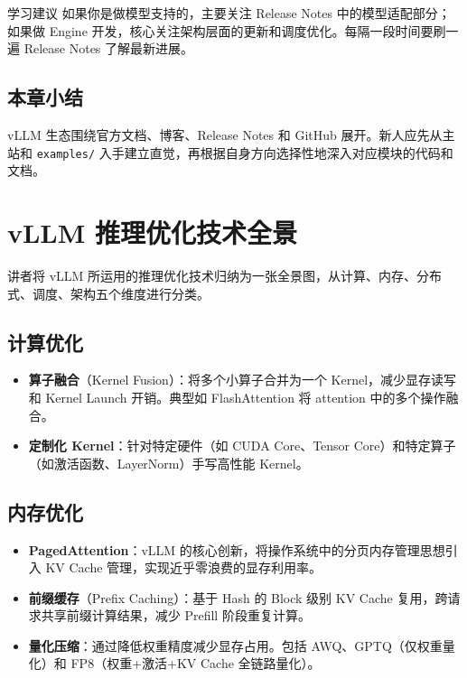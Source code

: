 \documentclass[a4paper]{article}
\begin{document}
\begin{knowledgebox}{学习建议}
    如果你是做模型支持的，主要关注 Release Notes 中的模型适配部分；如果做 Engine 开发，核心关注架构层面的更新和调度优化。每隔一段时间要刷一遍 Release Notes 了解最新进展。
\end{knowledgebox}

\subsection{本章小结}
vLLM 生态围绕官方文档、博客、Release Notes 和 GitHub 展开。新人应先从主站和 \texttt{examples/} 入手建立直觉，再根据自身方向选择性地深入对应模块的代码和文档。

\section{vLLM 推理优化技术全景}

讲者将 vLLM 所运用的推理优化技术归纳为一张全景图，从计算、内存、分布式、调度、架构五个维度进行分类。

\subsection{计算优化}
\begin{itemize}
    \item \textbf{算子融合}（Kernel Fusion）：将多个小算子合并为一个 Kernel，减少显存读写和 Kernel Launch 开销。典型如 FlashAttention 将 attention 中的多个操作融合。
    \item \textbf{定制化 Kernel}：针对特定硬件（如 CUDA Core、Tensor Core）和特定算子（如激活函数、LayerNorm）手写高性能 Kernel。
\end{itemize}

\subsection{内存优化}
\begin{itemize}
    \item \textbf{PagedAttention}：vLLM 的核心创新，将操作系统中的分页内存管理思想引入 KV Cache 管理，实现近乎零浪费的显存利用率。
    \item \textbf{前缀缓存}（Prefix Caching）：基于 Hash 的 Block 级别 KV Cache 复用，跨请求共享前缀计算结果，减少 Prefill 阶段重复计算。
    \item \textbf{量化压缩}：通过降低权重精度减少显存占用。包括 AWQ、GPTQ（仅权重量化）和 FP8（权重+激活+KV Cache 全链路量化）。
\end{itemize}
\end{document}
